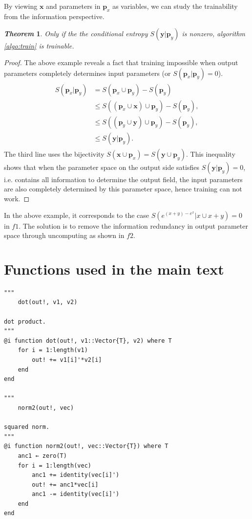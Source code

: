 \documentclass[aps,twocolumn,longbibliography,english,superscriptaddress]{revtex4-1}
\newcommand{\<}{\langle}
\renewcommand{\>}{\rangle}
\newcommand{\vx}{{\mathbf{x}}}
\newcommand{\vp}{{\mathbf{p}}}
\newcommand{\vy}{{\mathbf{y}}}
\newtheorem{theorem}{\textit{Theorem}}
\theoremstyle{definition}\newtheorem{definition}{\textit{Definition}}
\begin{document}
By viewing $\vx$ and parameters in $\vp_x$ as variables, we can study the trainability from the information perspective.
\begin{theorem}
    Only if the the conditional entropy $S(\vy|\vp_y)$ is nonzero, algorithm \ref{algo:train} is trainable.
\end{theorem}
\begin{proof}
The above example reveals a fact that training impossible when output parameters completely determines input parameters (or $S(\vp_x | \vp_y) = 0$).
\begin{align}
    \begin{split}
        S(\vp_x | \vp_y) &= S(\vp_x \cup \vp_y) - S(\vp_y)\\
        &\leq S\left((\vp_x \cup \vx) \cup \vp_y \right) - S(\vp_y),\\
        &\leq S\left((\vp_y \cup \vy) \cup \vp_y\right) - S(\vp_y),\\
    &\leq S(\vy|\vp_y).
    \end{split}
\end{align}
The third line uses the bijectivity $S(\vx \cup \vp_x) = S(\vy \cup \vp_y)$.
This inequality shows that when the parameter space on the output side satisfies $S(\vy | \vp_y) = 0$, i.e. contains all information to determine the output field, the input parameters are also completely determined by this parameter space, hence training can not work.
\end{proof}
In the above example, it corresponds to the case $S\left(e^{(x+y)-e^x} | x \cup x + y\right) = 0$ in $f1$.
The solution is to remove the information redundancy in output parameter space through uncomputing as shown in $f2$.

\section{Functions used in the main text}\label{app:functions}

\begin{minipage}{.44\textwidth}
\begin{lstlisting}
"""
    dot(out!, v1, v2)

dot product.
"""
@i function dot(out!, v1::Vector{T}, v2) where T
    for i = 1:length(v1)
        out! += v1[i]'*v2[i]
    end
end

"""
    norm2(out!, vec)

squared norm.
"""
@i function norm2(out!, vec::Vector{T}) where T
    anc1 ← zero(T)
    for i = 1:length(vec)
        anc1 += identity(vec[i]')
        out! += anc1*vec[i]
        anc1 -= identity(vec[i]')
    end
end
\end{lstlisting}
\end{minipage}
\end{document}
